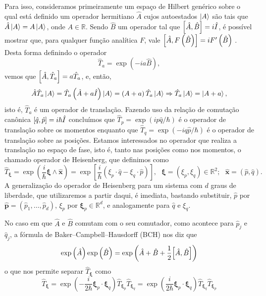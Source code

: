 \documentclass[
	12pt,
	oneside,			%
	a4paper,			%
	english,			%
	brazil				%
	]{abntex2}
\theoremstyle{definition}
\begin{document}
Para isso, consideramos primeiramente um espaço de Hilbert genérico sobre o qual está definido um operador hermitiano $\hat{A}$ cujos autoestados $\ket{A}$ são tais que $\hat{A} \ket{A} = A \ket{A}$, onde $A \in \mathbb{R}$. Sendo $\hat{B}$ um operador tal que $\comm{\hat{A}}{\hat{B}} = i \hat{I}$, é possível mostrar que, para qualquer função analítica $F$, vale $\comm{\hat{A}}{F\left(\hat{B}\right)} = i F' \left( \hat{B} \right)$ \cite{cohen2019quantum}. Desta forma definindo o operador
\begin{equation}
    \hat{T}_a = \exp \left( -i a \hat{B} \right),
\end{equation}
vemos que $\comm{\hat{A} }{\hat{T}_a} = a\hat{T}_a$, e, então,
\begin{equation}
    \hat{A} \hat{T}_a \ket{A} = \hat{T}_a \left(\hat{A} + a \hat{I}\right) \ket{A} = \left(A + a\right)\hat{T}_a \ket{A} \Rightarrow \hat{T}_a \ket{A}  = \ket{A+a},
\end{equation}
isto é, $\hat{T}_a$ é um operador de translação. Fazendo uso da relação de comutação canônica $\comm{\hat{q}}{\hat{p}} = i \hbar \hat{I}$ concluímos que $\hat{T}_p = \exp \left( i p \hat{q}/\hbar \right)$ é o operador de translação sobre os momentos enquanto que $\hat{T}_q = \exp \left( -i q \hat{p}/\hbar \right)$ é o operador de translação sobre as posições. Estamos interessados no operador que realiza a translação no espaço de fase, isto é, tanto nas posições como nos momentos, o chamado operador de Heisenberg, que definimos como
\begin{equation}
    \label{def_heisenberg}
    \hat{T}_{\boldsymbol{\xi}} = \exp \left( \frac{i}{\hbar} \boldsymbol{\xi} \wedge \hat{\mathbf{x}} \right) = \exp \left[ \frac{i}{\hbar} \left(\xi_p \cdot \hat{q}-\xi_q \cdot \hat{p}\right) \right], \ \ \ \boldsymbol{\xi} = (\xi_p,\xi_q) \in \mathbb{R}^2; \ \ \ \hat{\mathbf{x}} = \left( \hat{p},\hat{q} \right).
\end{equation}
A generalização do operador de Heisenberg para um sistema com $d$ graus de liberdade, que utilizaremos a partir daqui, é imediata, bastando substituir, $\hat{p}$ por $\hat{\mathbf{p}} = \left( \hat{p}_1,\ldots,\hat{p}_d \right)$, $\xi_p$ por $\boldsymbol{\xi}_p \in \mathbb{R}^d$, e analogamente para $\hat{q}$ e $\xi_q$.

No caso em que $\hat{A}$ e $\hat{B}$ comutam com o seu comutador, como acontece para $\hat{p}_j$ e $\hat{q}_j$, a fórmula de Baker–Campbell–Hausdorff (BCH) nos diz que
\begin{equation}
    \label{BCH}
    \exp \left(\hat{A}\right)\exp \left(\hat{B}\right) = \exp \left(\hat{A} + \hat{B} + \frac{1}{2}\comm{\hat{A}}{\hat{B}}\right)
\end{equation}
o que nos permite separar $\hat{T}_{\boldsymbol{\xi}}$ como
\begin{equation}
    \hat{T}_{\boldsymbol{\xi}} = \exp\left(- \frac{i}{2\hbar}\boldsymbol{\xi}_p \cdot \boldsymbol{\xi}_q\right) \hat{T}_{\boldsymbol{\xi}_p} \hat{T}_{\boldsymbol{\xi}_q} = \exp\left(\frac{i}{2\hbar}\boldsymbol{\xi}_p \cdot\boldsymbol{\xi}_q\right)\hat{T}_{\boldsymbol{\xi}_q} \hat{T}_{\boldsymbol{\xi}_p}
\end{equation}
\end{document}
